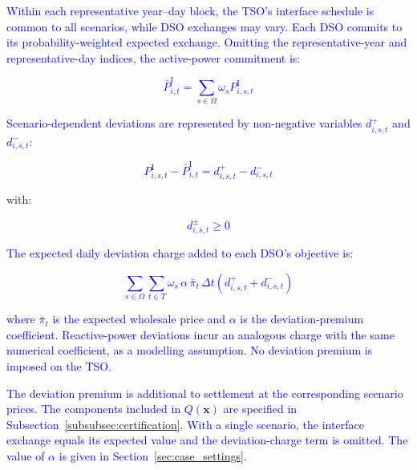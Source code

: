 \documentclass[preprint,12pt]{elsarticle}
\begin{document}
\textcolor{blue}{
    Within each representative year--day block, the TSO's interface schedule is common to all scenarios, while DSO exchanges may vary. Each DSO commits to its probability-weighted expected exchange. Omitting the representative-year and representative-day indices, the active-power commitment is:
}

\textcolor{blue}{
    \begin{equation}
        \bar{P}^{\text{I}}_{i,t}
        =
        \sum_{s\in\Omega}
        \omega_s P^{\text{I}}_{i,s,t}
        \label{eq:commitment_deviation}
    \end{equation}
}

\textcolor{blue}{
    Scenario-dependent deviations are represented by non-negative variables $d^{+}_{i,s,t}$ and $d^{-}_{i,s,t}$:
}

\textcolor{blue}{
    \begin{equation}
        P^{\text{I}}_{i,s,t}
        -
        \bar{P}^{\text{I}}_{i,t}
        =
        d^{+}_{i,s,t}
        -
        d^{-}_{i,s,t}
        \label{eq:interface_deviation}
    \end{equation}
}

\noindent
with:

\textcolor{blue}{
    \begin{equation}
        d^{\pm}_{i,s,t} \ge 0
        \label{eq:interface_deviation_nonnegative}
    \end{equation}
}

\textcolor{blue}{
    The expected daily deviation charge added to each DSO's objective is:
}

\textcolor{blue}{
    \begin{equation}
        \sum_{s\in\Omega}\sum_{t\in T}
        \omega_s\,\alpha\,\bar{\pi}_t\,\Delta t
        \left(d^{+}_{i,s,t}+d^{-}_{i,s,t}\right)
        \label{eq:commitment_charge}
    \end{equation}
}

\noindent
\textcolor{blue}{
    where $\bar{\pi}_t$ is the expected wholesale price and $\alpha$ is the deviation-premium coefficient.
    Reactive-power deviations incur an analogous charge with the same numerical coefficient, as a modelling assumption. No deviation premium is imposed on the TSO.
}

\textcolor{blue}{
    The deviation premium is additional to settlement at the corresponding scenario prices. The components included in $Q(\boldsymbol{x})$ are specified in Subsection~\ref{subsubsec:certification}.
    With a single scenario, the interface exchange equals its expected value and the deviation-charge term is omitted. 
    The value of $\alpha$ is given in Section~\ref{sec:case_settings}.
}
\end{document}
